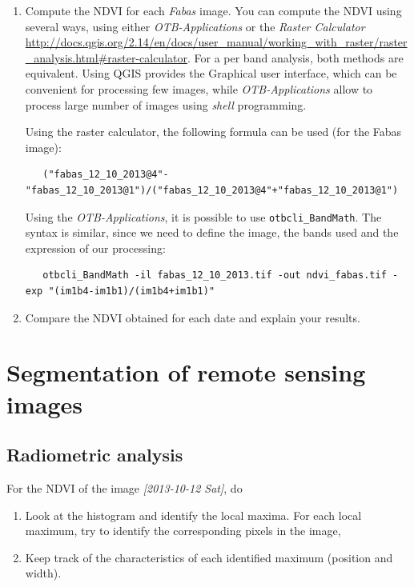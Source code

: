 \documentclass[a4paper,11pt,DIV=18]{scrartcl}
\begin{document}
\begin{work}
\begin{enumerate}
\item Compute  the NDVI for each  \emph{Fabas} image.  You can  compute the NDVI
using several  ways, using  either \emph{OTB-Applications} or  the \emph{Raster
Calculator}
\url{http://docs.qgis.org/2.14/en/docs/user\_manual/working\_with\_raster/raster\_analysis.html\#raster-calculator}.
For a per  band analysis, both methods are  equivalent.  Using QGIS
provides the Graphical user interface,  which can be convenient for
processing  few images,  while  \emph{OTB-Applications}  allow to  process
large number of images using \emph{shell} programming.

Using the raster calculator, the following formula can be used (for
the Fabas image):

\begin{verbatim}
   ("fabas_12_10_2013@4"-"fabas_12_10_2013@1")/("fabas_12_10_2013@4"+"fabas_12_10_2013@1")
\end{verbatim}

Using    the   \emph{OTB-Applications},    it   is    possible   to    use
\texttt{otbcli\_BandMath}. The syntax is similar, since we need to define the
image, the bands used and the expression of our processing:

\begin{verbatim}
   otbcli_BandMath -il fabas_12_10_2013.tif -out ndvi_fabas.tif -exp "(im1b4-im1b1)/(im1b4+im1b1)"
\end{verbatim}

\item Compare the NDVI obtained for each date and explain your results.
\end{enumerate}
\end{work}
\section{Segmentation of remote sensing images}
\label{sec:org60ec1bb}
\subsection{Radiometric analysis}
\label{sec:org6d57fa7}
\begin{work}
For the NDVI of the image \textit{[2013-10-12 Sat]}, do
\begin{enumerate}
\item Look  at the  histogram and  identify the  local maxima.   For each
local  maximum, try  to identify  the corresponding  pixels in  the
image,
\item Keep track  of  the characteristics  of  each identified  maximum
(position and width).
\end{enumerate}
\end{work}
\end{document}
